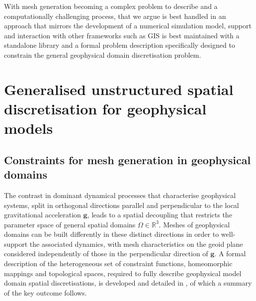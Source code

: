 \documentclass[a4paper, 10pt]{book}
\begin{document}
With mesh generation becoming a complex problem to describe and a computationally challenging process,
that we argue is best handled in an approach that mirrors the development of a numerical simulation model,
support and interaction with other frameworks such as GIS is best maintained
with a standalone library and a formal problem description specifically designed to constrain the general geophysical domain discretisation problem.
%




\chapter{Generalised unstructured spatial discretisation for geophysical models}
\label{sec:meshgeneration}
\section{Constraints for mesh generation in geophysical domains}
\label{sec:constraint}
%
The contrast in dominant dynamical processes that characterise geophysical systems,
split in orthogonal directions parallel and perpendicular to
the local gravitational acceleration $\boldsymbol{g}$,
leads to a spatial decoupling that
restricts the parameter space of general spatial domains
$\Omega \in \mathbb{R}^3$.
%
%
Meshes of geophysical domains can be built differently in these distinct directions in order to well-support the associated dynamics,
with mesh characteristics on the geoid plane
considered independently of those in the perpendicular direction of $\boldsymbol{g}$.
%
A formal description of the heterogeneous set of constraint functions, homeomorphic mappings and topological spaces,
required to fully describe geophysical model domain spatial discretisations,
is developed and detailed in \cite{candybrep},
of which a summary of the key outcome follows.
%
\end{document}
